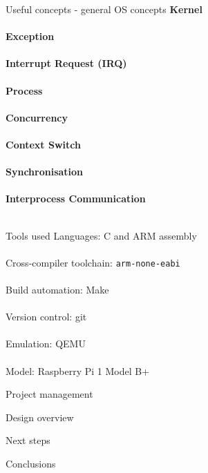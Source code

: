 \documentclass{beamer}
\begin{document}
\begin{frame}{Useful concepts - general OS concepts}
    \textbf{Kernel} \\~\\
    \textbf{Exception} \\~\\
    \textbf{Interrupt Request (IRQ)} \\~\\
    \textbf{Process} \\~\\
    \textbf{Concurrency} \\~\\
    \textbf{Context Switch} \\~\\
    \textbf{Synchronisation} \\~\\
    \textbf{Interprocess Communication} \\~\\
\end{frame}

\begin{frame}{Tools used}
    Languages: C and ARM assembly \\~\\
    Cross-compiler toolchain: \texttt{arm-none-eabi} \\~\\
    Build automation: Make \\~\\
    Version control: git \\~\\
    Emulation: QEMU \\~\\
    Model: Raspberry Pi 1 Model B+
\end{frame}

\begin{frame}{Project management}

\end{frame}

\begin{frame}{Design overview}

\end{frame}

\begin{frame}{Next steps}

\end{frame}

\begin{frame}{Conclusions}

\end{frame}
\end{document}
